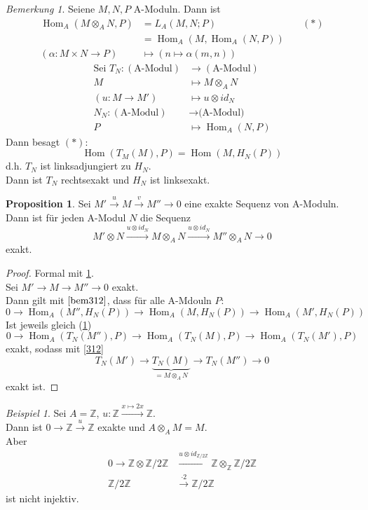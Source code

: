 \documentclass[10pt,a4paper]{article}
\newcommand{\Z}{\ensuremath{\mathbb{Z}}}
\newcommand{\al}{\ensuremath{\alpha}}
\newcommand{\Hom}{\operatorname{Hom}}
\newcounter{thm}[section]
\theoremstyle{definition}
\newtheorem{prop}[thm]{Proposition}
\theoremstyle{plain}
\theoremstyle{remark}
\newtheorem{bem}[thm]{Bemerkung}
\newtheorem{exm}[thm]{Beispiel}
\begin{document}
\begin{bem}
	\label{bem313}
	Seiene $M,N,P$ A-Moduln. Dann ist
	\begin{align*}
	\Hom_A(M\otimes_A N,P)&=L_A(M,N;P)&\quad (*)\\
	&=\Hom_A(M,\Hom_A(N,P))\\
	(\al:M\times N\rightarrow P)&\mapsto (n\mapsto \al(m,n))
	\end{align*}
	\begin{align*}
	\text{Sei }T_N:(\text{A-Modul})&\rightarrow (\text{A-Modul})\\
	M&\mapsto M\otimes_AN\\
	(u:M\rightarrow M')&\mapsto u\otimes id_N\\
	N_N:(\text{A-Modul})&\rightarrow \text{(A-Modul)}\\
	P&\mapsto \Hom_A(N,P)
	\end{align*}
	Dann besagt $(*)$:
	\[\Hom(T_M(M),P)=\Hom(M,H_N(P))\]
	d.h. $T_N$ ist linksadjungiert zu $H_N$.\\
	Dann ist $T_N$ rechtsexakt und $H_N$ ist linksexakt.
\end{bem}
\begin{prop}
	Sei $M'\xrightarrow{u}M\xrightarrow{v}M''\rightarrow 0$ eine exakte Sequenz von A-Moduln. Dann ist für jeden A-Modul $N$ die Sequenz
	\[M'\otimes N\xrightarrow{u\otimes id_N}M\otimes_AN\xrightarrow{u\otimes id_N}M''\otimes_A N\rightarrow 0\]
	exakt.
\end{prop}
\begin{proof}
	Formal mit \ref{bem313}.\\
	Sei $M'\rightarrow M \rightarrow M''\rightarrow 0$ exakt.\\
	Dann gilt mit $\ref{bem312}$, dass für alle A-Mdouln $P$:
	\[0\rightarrow \Hom_A(M'',H_N(P))\rightarrow \Hom_A(M,H_N(P))\rightarrow \Hom_A(M',H_N(P))\]
	Ist jeweils gleich (\ref{bem313})
	\[0\rightarrow \Hom_A(T_N(M''),P)\rightarrow \Hom_A(T_N(M),P)\rightarrow \Hom_A(T_N(M'),P)\]
	exakt, sodass mit \ref{312}
	\[T_N(M')\rightarrow \underbrace{T_N(M)}_{=M\otimes_AN}\rightarrow T_N(M'')\rightarrow 0\]
	exakt ist.
\end{proof}
\begin{exm}
	Sei $A=\Z$, $u:\Z\xrightarrow{x\mapsto2x}\Z$. \\
	Dann ist $0\rightarrow \Z\xrightarrow{u}\Z$ exakte und $A\otimes_A M=M$.\\
	Aber 
	\begin{align*}
	0\rightarrow \Z\otimes\Z/2\Z&\xrightarrow{u\otimes id_{\Z/2\Z}}\Z\otimes_\Z\Z/2\Z\\
	\Z/2\Z&\xrightarrow{\cdot 2}\Z/2\Z
	\end{align*}
	ist nicht injektiv.
\end{exm}
\end{document}

